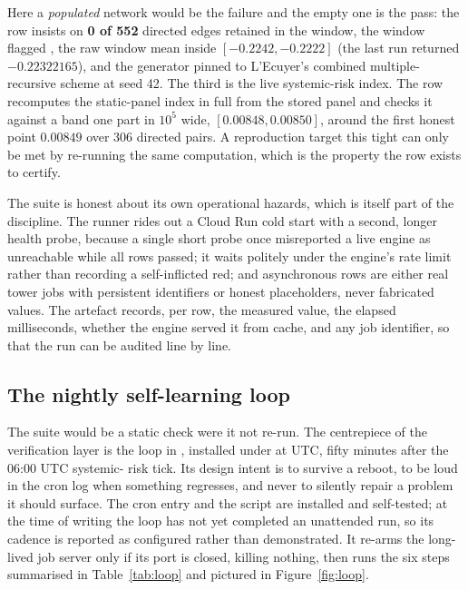 \noindent Here a \emph{populated} network would be the failure and the empty one
is the pass: the row insists on \textbf{0 of 552} directed edges retained in the
window, the window flagged , the raw window mean inside
$[-0.2242,-0.2222]$ (the last run returned $-0.22322165$), and the generator
pinned to L'Ecuyer's combined multiple-recursive scheme \citep{lecuyer1999} at
seed 42. The third is the live systemic-risk index. The  row
recomputes the static-panel index in full from the stored panel and checks it
against a band one part in $10^{5}$ wide, $[0.00848, 0.00850]$, around the first
honest point $0.00849$ over 306 directed pairs. A reproduction target this tight
can only be met by re-running the same computation, which is the property the row
exists to certify.

The suite is honest about its own operational hazards, which is itself part of
the discipline. The runner rides out a Cloud Run cold start with a second,
longer health probe, because a single short probe once misreported a live engine
as unreachable while all rows passed; it waits politely under the engine's
rate limit rather than recording a self-inflicted red; and asynchronous rows are
either real tower jobs with persistent identifiers or honest 
placeholders, never fabricated values. The artefact records, per row, the
measured value, the elapsed milliseconds, whether the engine served it from cache,
and any job identifier, so that the run can be audited line by line.

\subsection{The nightly self-learning loop}
\label{sec:verification-loop}

The suite would be a static check were it not re-run. The centrepiece of the
verification layer is the loop in , installed under
 at  UTC, fifty minutes after the 06:00 UTC systemic-
risk tick. Its design intent is to survive a reboot, to be loud in the cron log
when something regresses, and never to silently repair a problem it should
surface. The cron entry and the script are installed and self-tested; at the time
of writing the loop has not yet completed an unattended run, so its cadence is
reported as configured rather than demonstrated. It re-arms the long-lived job
server only if its port is closed, killing
nothing, then runs the six steps summarised in Table~\ref{tab:loop} and pictured
in Figure~\ref{fig:loop}.

